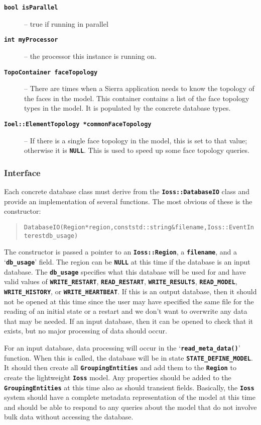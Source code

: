 \documentclass[11pt,twoside]{article}
\newcommand{\code}[1]
   {\mbox{\bf\tt #1}\null}
\newenvironment{source}
{\small\begin{quote}\begin{alltt}}
{\end{alltt}\end{quote}\normalsize}
\begin{document}
\begin{description}
\begin{center}
\begin{tabular}{rp{4in}}
\end{tabular}
\end{center}
\item [\code{bool isParallel}]-- true if running in parallel
\item [\code{int myProcessor}]-- the processor this instance is
	running on.
\item [\code{TopoContainer faceTopology}]-- There are times when
	a Sierra application needs to know the topology of the faces in the
	model. This container contains a list of the face topology types in the
	model. It is populated by the concrete database types.
\item [\code{Ioel::ElementTopology *commonFaceTopology}]-- If
	there is a single face topology in the model, this is set to that
	value; otherwise it is \code{NULL}. This is used to speed up
	some face topology queries.
\end{description}
\subsubsection{Interface}
Each concrete database class must derive from the
\code{Ioss::DatabaseIO} class and provide an implementation
of several functions. The most obvious of these is the constructor:
\begin{source}
DatabaseIO (Region *region, const std::string \&filename, Ioss::EventInterest db\_usage)
\end{source}

The constructor is passed a pointer to an \code{Ioss::Region},
a \code{filename}, and a `\code{db\_usage}' field.
The region can be \code{NULL} at this time if the database is
an input database. The \code{db\_usage} specifies what this
database will be used for and have valid values of
\code{WRITE\_RESTART}, \code{READ\_RESTART},
\code{WRITE\_RESULTS}, \code{READ\_MODEL},
\code{WRITE\_HISTORY}, or \code{WRITE\_HEARTBEAT}.
If this is an output database, then it should not be opened at this
time since the user may have specified the same file for the reading of
an initial state or a restart and we don't want to overwrite any data
that may be needed. If an input database, then it can be opened to
check that it exists, but no major processing of data should occur.

For an input database, data processing will occur in the
`\code{read\_meta\_data()}' function. When this is called,
the database will be in state \code{STATE\_DEFINE\_MODEL}. It
should then create all \code{GroupingEntities} and add them
to the \code{Region} to create the lightweight
\code{Ioss} model. Any properties should be added to the
\code{GroupingEntities} at this time also as should transient
fields. Basically, the \code{Ioss} system should have a
complete metadata representation of the model at this time and should
be able to respond to any queries about the model that do not involve
bulk data without accessing the database.
\end{document}

